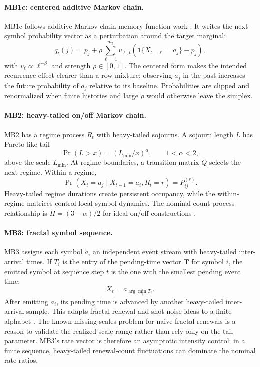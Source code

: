 \documentclass[journal]{IEEEtran}
\newcommand{\vect}[1]{\boldsymbol{#1}}
\begin{document}
\paragraph{MB1c: centered additive Markov chain.}
MB1c follows additive Markov-chain memory-function work
\cite{melnyk2006_memory,mayzelis2006_additive,melnik2014_entropy}. It writes
the next-symbol probability vector as a perturbation around the target marginal:
\begin{equation}
  q_t(j) = p_j + \rho\sum_{\ell=1}^{m_t} v_{\ell,t}
          \left(\mathbf{1}\{X_{t-\ell}=a_j\}-p_j\right),
\end{equation}
with $v_\ell\propto \ell^{-\beta}$ and strength $\rho\in[0,1]$. The centered
form makes the intended recurrence effect clearer than a row mixture: observing
$a_j$ in the past increases the future probability of $a_j$ relative to its
baseline. Probabilities are clipped and renormalized when finite histories and
large $\rho$ would otherwise leave the simplex.

\paragraph{MB2: heavy-tailed on/off Markov chain.}
MB2 has a regime process $R_t$ with heavy-tailed sojourns. A sojourn length $L$
has Pareto-like tail
\begin{equation}
  \Pr(L>x) = (L_{\min}/x)^\alpha,\qquad 1<\alpha<2,
\end{equation}
above the scale $L_{\min}$. At regime boundaries, a transition matrix $Q$
selects the next regime. Within a regime,
\begin{equation}
  \Pr(X_t=a_j\mid X_{t-1}=a_i,R_t=r)=P^{(r)}_{ij}.
\end{equation}
Heavy-tailed regime durations create persistent occupancy, while the
within-regime matrices control local symbol dynamics. The nominal count-process
relationship is $H=(3-\alpha)/2$ for ideal on/off constructions
\cite{garrett1994_analysis,ryu1998_point}.

\paragraph{MB3: fractal symbol sequence.}
MB3 assigns each symbol $a_i$ an independent event stream with heavy-tailed
inter-arrival times. If \(T_i\) is the entry of the pending-time vector
\(\vect{T}\) for symbol \(i\), the
emitted symbol at sequence step $t$ is the one with the smallest pending event
time:
\begin{equation}
  X_t = a_{\arg\min_i T_i}.
\end{equation}
After emitting $a_i$, its pending time is advanced by another heavy-tailed
inter-arrival sample. This adapts fractal renewal and shot-noise ideas to a
finite alphabet \cite{lowen1995_estimation,ryu1998_point}. The known
missing-scales problem for naive fractal renewals \cite{roughan1999_the} is a
reason to validate the realized scale range rather than rely only on the tail
parameter. MB3's rate vector is therefore an asymptotic intensity control: in a
finite sequence, heavy-tailed renewal-count fluctuations can dominate the
nominal rate ratios.
\end{document}
